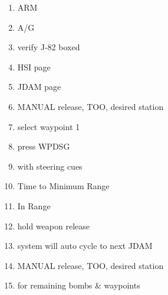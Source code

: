 \documentclass[fontInter, widesubsec]{TechCheck}
\begin{document}
	\begin{enumerate}
		\item {}\dotfill ARM
		\item {}\dotfill A/G
		\item {}\dotfill verify J-82 boxed
		\item {}\dotfill HSI page
		\item {}\dotfill JDAM page
		\item {}\dotfill MANUAL release, TOO, desired station
		\item {}\dotfill select waypoint 1
		\item {}\dotfill press WPDSG
		\item {}\dotfill with steering cues
		\item {}\dotfill Time to Minimum Range
		\item {}\dotfill In Range
		\item {}\dotfill hold weapon release
		\item {}\dotfill system will auto cycle to next JDAM
		\item {}\dotfill MANUAL release, TOO, desired station
		\item {}\dotfill for remaining bombs \& waypoints
	\end{enumerate}
\end{document}
